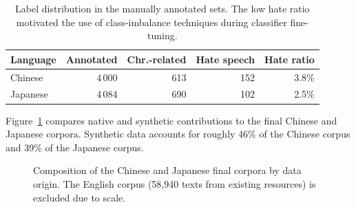 \documentclass[../CLthesis.tex]{subfiles}
\begin{document}
\begin{table}[t]
\centering
\small
\begin{tabular}{@{}lrrrr@{}}
\toprule
Language & Annotated & Chr.-related & Hate speech & Hate ratio \\
\midrule
Chinese  & 4\,000 & 613 & 152 & 3.8\% \\
Japanese & 4\,084 & 690 & 102 & 2.5\% \\
\bottomrule
\end{tabular}
\caption{Label distribution in the manually annotated sets. The low hate ratio motivated the use of class-imbalance techniques during classifier fine-tuning.}
\label{tab:annotation-distribution}
\end{table}

Figure~\ref{fig:corpus-composition} compares native and synthetic contributions to the final Chinese and Japanese corpora. Synthetic data accounts for roughly 46\% of the Chinese corpus and 39\% of the Japanese corpus.

\begin{figure}[t]
\centering
{}
\caption{Composition of the Chinese and Japanese final corpora by data origin. The English corpus (58,940 texts from existing resources) is excluded due to scale.}
\label{fig:corpus-composition}
\end{figure}
\end{document}
